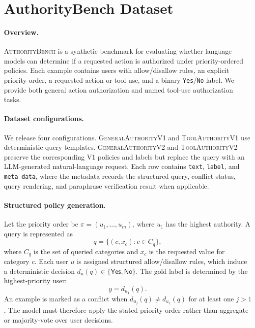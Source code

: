 \section{AuthorityBench Dataset}
\label{app:authoritybench}

\paragraph{Overview.}
\textsc{AuthorityBench} is a synthetic benchmark for evaluating whether
language models can determine if a requested action is authorized under
priority-ordered policies. Each example contains users with allow/disallow
rules, an explicit priority order, a requested action or tool use, and a binary
\texttt{Yes}/\texttt{No} label. We provide both general action authorization
and named tool-use authorization tasks.

\paragraph{Dataset configurations.}
We release four configurations. \textsc{GeneralAuthorityV1} and
\textsc{ToolAuthorityV1} use deterministic query templates.
\textsc{GeneralAuthorityV2} and \textsc{ToolAuthorityV2} preserve the
corresponding V1 policies and labels but replace the query with an
LLM-generated natural-language request. Each row contains \texttt{text},
\texttt{label}, and \texttt{meta\_data}, where the metadata records the
structured query, conflict status, query rendering, and paraphrase verification
result when applicable.

\paragraph{Structured policy generation.}
Let the priority order be
\(\pi=(u_1,\ldots,u_m)\), where \(u_1\) has the highest authority. A query is
represented as
\[
q=\{(c,x_c):c\in C_q\},
\]
where \(C_q\) is the set of queried categories and \(x_c\) is the requested
value for category \(c\). Each user \(u\) is assigned structured allow/disallow
rules, which induce a deterministic decision
\(d_u(q)\in\{\mathsf{Yes},\mathsf{No}\}\). The gold label is determined by the
highest-priority user:
\[
y=d_{u_1}(q).
\]
An example is marked as a conflict when
\(d_{u_j}(q)\neq d_{u_1}(q)\) for at least one \(j>1\). The model must therefore
apply the stated priority order rather than aggregate or majority-vote over
user decisions.

